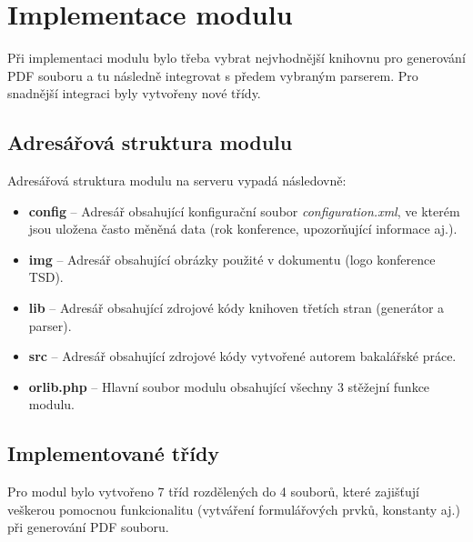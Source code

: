 \DeclarePairedDelimiter\ceil{\lceil}{\rceil}
\DeclarePairedDelimiter\floor{\lfloor}{\rfloor}

\chapter{Implementace modulu}
Při implementaci modulu bylo třeba vybrat nejvhodnější knihovnu pro generování PDF souboru a tu následně integrovat s předem vybraným parserem. Pro snadnější integraci byly vytvořeny nové třídy.
\section{Adresářová struktura modulu}
Adresářová struktura modulu na serveru vypadá následovně:
\begin{itemize}
	\item \textbf{config} -- Adresář obsahující konfigurační soubor \textit{configuration.xml}, ve kterém jsou uložena často měněná data (rok konference, upozorňující informace aj.).  
	\item \textbf{img} -- Adresář obsahující obrázky použité v dokumentu (logo konference TSD).
	\item \textbf{lib} -- Adresář obsahující zdrojové kódy knihoven třetích stran (generátor a parser).
	\item \textbf{src} -- Adresář obsahující zdrojové kódy vytvořené autorem bakalářské práce.
	\item \textbf{orlib.php} -- Hlavní soubor modulu obsahující všechny 3 stěžejní funkce modulu.
\end{itemize}
\section{Implementované třídy}
Pro modul bylo vytvořeno 7 tříd rozdělených do 4 souborů, které zajišťují veškerou pomocnou funkcionalitu (vytváření formulářových prvků, konstanty aj.) při generování PDF souboru. 
